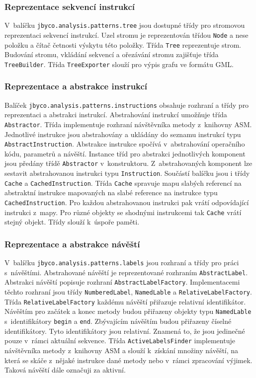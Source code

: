 \subsubsection{Reprezentace sekvencí instrukcí}

V~balíčku \texttt{jbyco.analysis.patterns.tree} jsou dostupné třídy pro stromovou reprezentaci sekvencí instrukcí. Uzel stromu je reprezentován třídou \texttt{Node} a nese položku a čítač četnosti výskytu této položky. Třída \texttt{Tree} reprezentuje strom. Budování stromu, vkládání sekvencí a ořezávání stromu zajišťuje třída \texttt{TreeBuilder}. Třída \texttt{TreeExporter} slouží pro výpis grafu ve formátu GML.

\subsubsection{Reprezentace a abstrakce instrukcí}

Balíček \texttt{jbyco.analysis.patterns.instructions} obsahuje rozhraní a třídy pro reprezentaci a abstrakci instrukcí. Abstrahování instrukcí umožňuje třída \texttt{Abstractor}. Třída implementuje rozhraní návštěvníka metody z~knihovny ASM. Jednotlivé instrukce jsou abstrahovány a ukládány do seznamu instrukcí typu \texttt{AbstractInstruction}. Abstrakce instrukce spočívá v~abstrahování operačního kódu, parametrů a návěští. Instance tříd pro abstrakci jednotlivých komponent jsou předány třídě \texttt{Abstractor} v~konstruktoru. Z~abstrahovaných komponent lze sestavit abstrahovanou instrukci typu \texttt{Instruction}. Součástí balíčku jsou i třídy \texttt{Cache} a \texttt{CachedInstruction}. Třída \texttt{Cache} spravuje mapu slabých referencí na abstraktní instrukce mapovaných na slabé reference na instrukce typu \texttt{CachedInstruction}. Pro každou abstrahovanou instrukci pak vrátí odpovídající instrukci z~mapy. Pro různé objekty se shodnými instrukcemi tak \texttt{Cache} vrátí stejný objekt. Třídy slouží k~úspoře paměti.

\subsubsection{Reprezentace a abstrakce návěští}

V~balíčku \texttt{jbyco.analysis.patterns.labels} jsou rozhraní a třídy pro práci s~návěštími. Abstrahované návěští je reprezentované rozhraním \texttt{AbstractLabel}. Abstrakci návěští popisuje rozhraní \texttt{AbstractLabelFactory}. Implementacemi těchto rozhraní jsou třídy \texttt{NumberedLabel}, \texttt{NamedLable} a \texttt{RelativeLabelFactory}. Třída \texttt{RelativeLabelFactory} každému návěští přiřazuje relativní identifikátor. Návěštím pro začátek a konec metody budou přiřazeny objekty typu \texttt{NamedLable} s~identifikátory \texttt{begin} a \texttt{end}. Zbývajícím návěštím budou přiřazeny číselné identifikátory. Tyto identifikátory jsou relativní. Znamená to, že jsou jedinečné pouze v~rámci aktuální sekvence. Třída \texttt{ActiveLabelsFinder} implementuje návštěvníka metody z~knihovny ASM a slouží k~získání množiny návěští, na která se skáče z~nějaké instrukce dané metody nebo v~rámci zpracování výjimek. Taková návěští dále označuji za aktivní.

